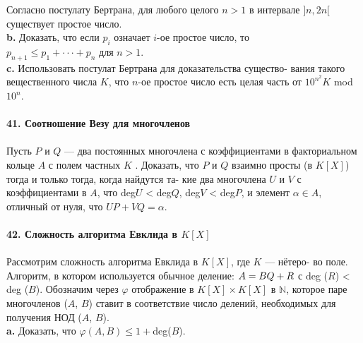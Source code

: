 \documentclass{mai_book}
\begin{document}
\noindent\hspace*{10pt}Согласно постулату Бертрана, для любого целого $n > 1$ в интервале\linebreak
$]n, 2n[$ существует простое число.\\
\hspace*{10pt}\textbf{b.} Доказать, что если $p_i$ означает $i$-ое простое число, то\\
$p_{n+1}\leq p_1+\cdot\cdot\cdot+p_n$ для $n>1$.\\
\hspace*{10pt}\textbf{c.} Использовать постулат Бертрана для доказательства существо-\linebreak
вания такого вещественного числа $K$, что $n$-ое простое число есть целая\linebreak
часть от $10^{n{^2}} K$ mod $10^n$.
\\
\\
\noindent\textbf{41. Соотношение Везу для многочленов}\\\\
\hspace*{10pt}Пусть $P$ и $Q$ — два постоянных многочлена с коэффициентами в\linebreak
факториальном кольце $A$ с полем частных $K$ . Доказать, что $P$ и $Q$\linebreak
взаимно просты (в $K [X]$) тогда и только тогда, когда найдутся та-\linebreak
кие два многочлена $U$ и $V$ с коэффициентами в $A$, что deg$U$ < deg$Q$,\linebreak
deg$V$ < deg$P$, и элемент $\alpha \in A$, отличный от нуля, что $UP + VQ = \alpha.$
\\
\\
\noindent\textbf{42. Сложность алгоритма Евклида в $K[X]$}\\\\
\hspace*{10pt}Рассмотрим сложность алгоритма Евклида в $K[X]$, где $K$ — нётеро-\linebreak
во поле. Алгоритм, в котором используется обычное деление: $A = BQ +\linebreak
R$ с deg ($R$) < deg ($B$). Обозначим через $\varphi$ отображение в $K[X] \times K[X]$ в $\mathbb{N}$,\linebreak
которое паре многочленов ($A$, $B$) ставит в соответствие число делений,\linebreak
необходимых для получения НОД ($A$, $B$).\\
\hspace*{10pt}\textbf{a.} Доказать, что $\varphi (A,B)\leq 1 + $deg($B$).\\
\end{document}
